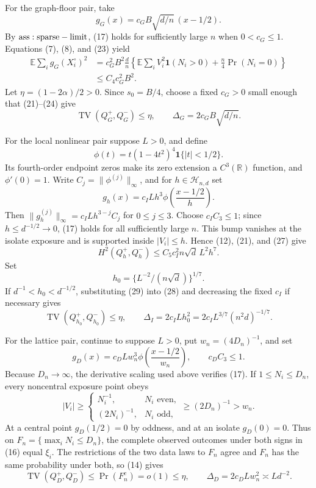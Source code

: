 For the graph-floor pair, take
\[
 g_G(x)=c_GB\sqrt{d/n}\,(x-1/2).
\tag{23}
\]
By \({\rm ass:sparse-limit}\), (17) holds for sufficiently large \(n\) when \(0<c_G\leq1\).  Equations (7), (8), and (23) yield
\[
\begin{aligned}
 \mathbb E\sum_i g_G(X_i^\circ)^2
 &=c_G^2B^2\frac dn
 \left\{\mathbb E\sum_iV_i^2\mathbf1(N_i>0)
 +\frac n4\Pr(N_i=0)\right\}\\
 &\leq C_4c_G^2B^2.
\end{aligned}
\tag{24}
\]
Let \(\eta=(1-2\alpha)/2>0\).  Since \(s_0=B/4\), choose a fixed \(c_G>0\) small enough that (21)--(24) give
\[
 \operatorname{TV}(Q_G^+,Q_G^-)\leq\eta,
 \qquad \Delta_G=2c_GB\sqrt{d/n}.
\tag{25}
\]

For the local nonlinear pair suppose \(L>0\), and define
\[
 \phi(t)=t(1-4t^2)^4\mathbf1\{|t|<1/2\}.
\tag{26}
\]
Its fourth-order endpoint zeros make its zero extension a \(C^3(\mathbb R)\) function, and \(\phi'(0)=1\).  Write \(C_j=\|\phi^{(j)}\|_\infty\), and for \(h\in\mathcal H_{n,d}\) set
\[
 g_h(x)=c_ILh^3\phi\!\left(\frac{x-1/2}{h}\right).
\tag{27}
\]
Then \(\|g_h^{(j)}\|_\infty=c_ILh^{3-j}C_j\) for \(0\leq j\leq3\).  Choose \(c_IC_3\leq1\); since \(h\leq d^{-1/2}\to0\), (17) holds for all sufficiently large \(n\).  This bump vanishes at the isolate exposure and is supported inside \(|V_i|\leq h\).  Hence (12), (21), and (27) give
\[
 H^2(Q_h^+,Q_h^-)\leq C_5c_I^2n\sqrt d\,L^2h^7.
\tag{28}
\]
Set
\[
 h_0=\{L^{-2}/(n\sqrt d)\}^{1/7}.
\tag{29}
\]
If \(d^{-1}<h_0<d^{-1/2}\), substituting (29) into (28) and decreasing the fixed \(c_I\) if necessary gives
\[
 \operatorname{TV}(Q_{h_0}^+,Q_{h_0}^-)\leq\eta,
 \qquad \Delta_I=2c_ILh_0^2=2c_IL^{3/7}(n^2d)^{-1/7}.
\tag{30}
\]

For the lattice pair, continue to suppose \(L>0\), put \(w_n=(4D_n)^{-1}\), and set
\[
 g_D(x)=c_DLw_n^3\phi\!\left(\frac{x-1/2}{w_n}\right),
 \qquad c_DC_3\leq1.
\tag{31}
\]
Because \(D_n\to\infty\), the derivative scaling used above verifies (17).  If \(1\leq N_i\leq D_n\), every noncentral exposure point obeys
\[
 |V_i|\geq
 \begin{cases}N_i^{-1},&N_i\text{ even},\\(2N_i)^{-1},&N_i\text{ odd},\end{cases}
 \geq(2D_n)^{-1}>w_n.
\tag{32}
\]
At a central point \(g_D(1/2)=0\) by oddness, and at an isolate \(g_D(0)=0\).  Thus on \(F_n=\{\max_iN_i\leq D_n\}\), the complete observed outcomes under both signs in (16) equal \(\xi_i\).  The restrictions of the two data laws to \(F_n\) agree and \(F_n\) has the same probability under both, so (14) gives
\[
 \operatorname{TV}(Q_D^+,Q_D^-)\leq\Pr(F_n^c)=o(1)\leq\eta,
 \qquad \Delta_D=2c_DLw_n^2\asymp Ld^{-2}.
\tag{33}
\]

